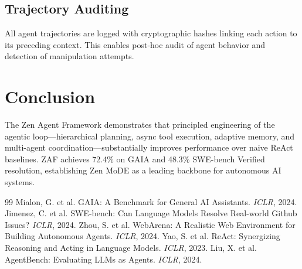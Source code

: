 \documentclass[11pt,a4paper]{article}
\begin{document}
\subsection{Trajectory Auditing}

All agent trajectories are logged with cryptographic hashes linking each action to its preceding context. This enables post-hoc audit of agent behavior and detection of manipulation attempts.

\section{Conclusion}

The Zen Agent Framework demonstrates that principled engineering of the agentic loop—hierarchical planning, async tool execution, adaptive memory, and multi-agent coordination—substantially improves performance over naive ReAct baselines. ZAF achieves 72.4\% on GAIA and 48.3\% SWE-bench Verified resolution, establishing Zen MoDE as a leading backbone for autonomous AI systems.

\begin{thebibliography}{99}
 Mialon, G. et al. GAIA: A Benchmark for General AI Assistants. \textit{ICLR}, 2024.
 Jimenez, C. et al. SWE-bench: Can Language Models Resolve Real-world Github Issues? \textit{ICLR}, 2024.
 Zhou, S. et al. WebArena: A Realistic Web Environment for Building Autonomous Agents. \textit{ICLR}, 2024.
 Yao, S. et al. ReAct: Synergizing Reasoning and Acting in Language Models. \textit{ICLR}, 2023.
 Liu, X. et al. AgentBench: Evaluating LLMs as Agents. \textit{ICLR}, 2024.
\end{thebibliography}
\end{document}

